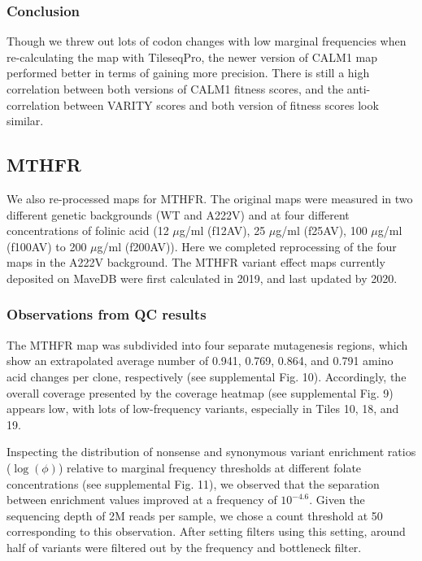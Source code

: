 \documentclass{article}
\begin{document}
\subsubsection{Conclusion}
Though we threw out lots of codon changes with low marginal frequencies when re-calculating the map with TileseqPro, the newer version of CALM1 map performed better in terms of gaining more precision. There is still a high correlation between both versions of CALM1 fitness scores, and the anti-correlation between VARITY scores and both version of fitness scores look similar.


\subsection{MTHFR}
We also re-processed maps for MTHFR\cite{weile_shifting_2021}. The original maps were measured in two different genetic backgrounds (WT and A222V) and at four different concentrations of folinic acid (12 $\mu$g/ml (f12AV), 25 $\mu$g/ml (f25AV), 100 $\mu$g/ml (f100AV) to 200 $\mu$g/ml (f200AV)). Here we completed reprocessing of the four maps in the A222V background. The MTHFR variant effect maps currently deposited on MaveDB were first calculated in 2019, and last updated by 2020.

\subsubsection{Observations from QC results}
The MTHFR map was subdivided into four separate mutagenesis regions, which show an extrapolated average number of 0.941, 0.769, 0.864, and 0.791 amino acid changes per clone, respectively (see supplemental Fig. 10). Accordingly, the overall coverage presented by the coverage heatmap (see supplemental Fig. 9) appears low, with lots of low-frequency variants, especially in Tiles 10, 18, and 19.

Inspecting the distribution of nonsense and synonymous variant enrichment ratios ($\log(\phi)$) relative to marginal frequency thresholds at different folate concentrations (see supplemental Fig. 11), we observed that the separation between enrichment values improved at a frequency of ${10}^{-4.6}$. Given the sequencing depth of 2M reads per sample, we chose a count threshold at 50 corresponding to this observation. After setting filters using this setting, around half of variants were filtered out by the frequency and bottleneck filter.
\end{document}
